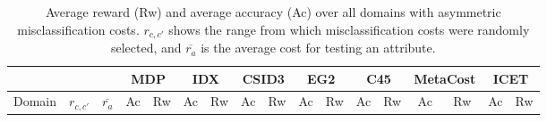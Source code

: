 \documentclass[letterpaper]{article}
\theoremstyle{definition}
\begin{document}
\begin{table}
\centering
\scriptsize
\caption{Average reward (Rw) and average accuracy (Ac) over all domains with asymmetric misclassification costs. $r_{c,c'}$ shows the range from which misclassification costs were randomly selected, and $\overline{r_a}$ is the average cost for testing an attribute.}
\begin{tabular}{|c|c|c|c|c|c|c|c|c|c|c|c|c|c|c|c|c|}
\hline
&&& \multicolumn{2}{c|}{MDP}     & \multicolumn{2}{c|}{IDX} & \multicolumn{2}{c|}{CSID3}   & \multicolumn{2}{c|}{EG2} & \multicolumn{2}{c|}{C45}    & \multicolumn{2}{c|}{MetaCost} & \multicolumn{2}{c|}{ICET}    \\ \hline
Domain&$r_{c,c'}$&$\overline{r_a}$&Ac&Rw&Ac&Rw&Ac&Rw&Ac&Rw&Ac&Rw&Ac&Rw&Ac&Rw \\ \hline


\end{tabular}
\end{table}
\end{document}
